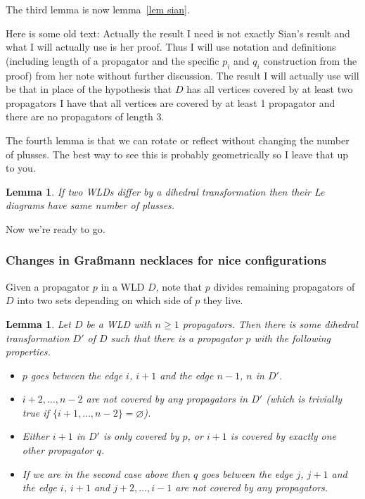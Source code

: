 \documentclass[11pt]{article}
\newtheorem{lem}[thm]{Lemma}
\theoremstyle{remark}
\theoremstyle{definition}
\begin{document}
The third lemma is now lemma~\ref{lem sian}.

Here is some old text: Actually the result I need is not exactly Sian's result and what I will actually use is her proof.  Thus I will use notation and definitions (including length of a propagator and the specific $p_i$ and $q_i$ construction from the proof) from her note without further discussion.  The result I will actually use will be that in place of the hypothesis that $D$ has all vertices covered by at least two propagators I have that all vertices are covered by at least 1 propagator and there are no propagators of length 3.

The fourth lemma is that we can rotate or reflect without changing the number of plusses.  The best way to see this is probably geometrically so I leave that up to you.

\begin{lem}\label{lem dihedral}
  If two WLDs differ by a dihedral transformation then their Le diagrams have same number of plusses.
\end{lem}

Now we're ready to go.

\subsubsection{Changes in Gra\ss mann necklaces for nice configurations}

Given a propagator $p$ in a WLD $D$, note that $p$ divides remaining propagators of $D$ into two sets depending on which side of $p$ they live.

\begin{lem}\label{lem good p}
  Let $D$ be a WLD with $n\geq 1$ propagators.  Then there is some dihedral transformation $D'$ of $D$ such that there is a propagator $p$ with the following properties.
  \begin{itemize}
  \item $p$ goes between the edge $i$, $i+1$ and the edge $n-1$, $n$ in $D'$.
  \item $i+2, \ldots, n-2$ are not covered by any propagators in $D'$ (which is trivially true if $\{i+1, \ldots, n-2\}=\varnothing$).
  \item Either $i+1$ in $D'$ is only covered by $p$, or $i+1$ is covered by exactly one other propagator $q$.
  \item If we are in the second case above then $q$ goes between the edge $j$, $j+1$ and the edge $i$, $i+1$ and $j+2, \ldots, i-1$ are not covered by any propagators.
  \end{itemize}
\end{lem}
\end{document}
